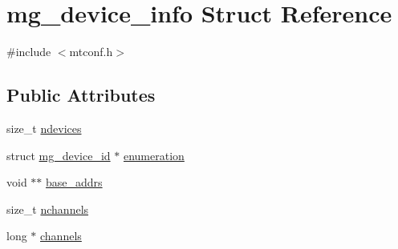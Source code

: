 \hypertarget{structmg__device__info}{\section{mg\+\_\+device\+\_\+info Struct Reference}
\label{structmg__device__info}
}


{\ttfamily \#include $<$mtconf.\+h$>$}

\subsection*{Public Attributes}
\begin{DoxyCompactItemize}
\item 
size\+\_\+t \hyperlink{structmg__device__info_a3a4739cbdca1cb830da50f0f9e564c69}{ndevices}
\item 
struct \hyperlink{structmg__device__id}{mg\+\_\+device\+\_\+id} $\ast$ \hyperlink{structmg__device__info_a22c8bc3d47e3c4c9964ef5bae6658ff5}{enumeration}
\item 
void $\ast$$\ast$ \hyperlink{structmg__device__info_aad84e3fbce68ce91f40e77f07d537ea7}{base\+\_\+addrs}
\item 
size\+\_\+t \hyperlink{structmg__device__info_a5298d88d4e8e074dd36bcef94a9ed699}{nchannels}
\item 
long $\ast$ \hyperlink{structmg__device__info_a809d69dd9ca1e776ff80b2ba5197d2fe}{channels}
\end{DoxyCompactItemize}


